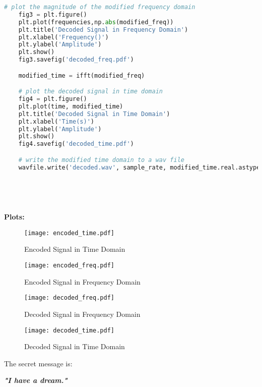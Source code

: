 \documentclass[10pt,a4paper, margin=1in]{article}
\begin{document}
\begin{enumerate}
\begin{lstlisting}[language=Python, caption=Message decoder that uses FFT\&IFFT implementaton ]
    # plot the magnitude of the modified frequency domain
    fig3 = plt.figure()
    plt.plot(frequencies,np.abs(modified_freq))
    plt.title('Decoded Signal in Frequency Domain')
    plt.xlabel('Frequency()')
    plt.ylabel('Amplitude')
    plt.show()
    fig3.savefig('decoded_freq.pdf')

    modified_time = ifft(modified_freq)

    # plot the decoded signal in time domain
    fig4 = plt.figure()
    plt.plot(time, modified_time)
    plt.title('Decoded Signal in Time Domain')
    plt.xlabel('Time(s)')
    plt.ylabel('Amplitude')
    plt.show()
    fig4.savefig('decoded_time.pdf')

    # write the modified time domain to a wav file
    wavfile.write('decoded.wav', sample_rate, modified_time.real.astype(data.dtype))






\end{lstlisting}

\textbf{Plots:}

\begin{figure}[!htb]
    \centering
    \texttt{[image: encoded\_time.pdf]}
    \caption{Encoded Signal in Time Domain}
    \label{fig:enter-label}
\end{figure}
\begin{figure}[!htb]
    \centering
    \texttt{[image: encoded\_freq.pdf]}
    \caption{Encoded Signal in Frequency Domain}
    \label{fig:enter-label}
\end{figure}
\begin{figure}[!htb]
    \centering
    \texttt{[image: decoded\_freq.pdf]}
    \caption{Decoded Signal in Frequency Domain}
    \label{fig:enter-label}
\end{figure}
\begin{figure}[!htb]
    \centering
    \texttt{[image: decoded\_time.pdf]}
    \caption{Decoded Signal in Time Domain}
    \label{fig:enter-label}
\end{figure}
\newpage
The secret message is:
\begin{center}
\Huge
\textbf{\textit{"I have a dream."}}
\end{center}

\end{enumerate}
\end{document}
